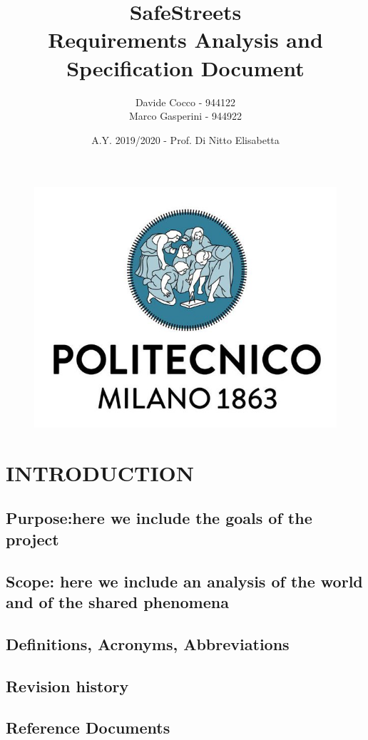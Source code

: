 \documentclass[12pt,a4paper]{article}
\author{Davide Cocco - 944122\\
	Marco Gasperini - 944922}
\date{A.Y. 2019/2020 - Prof. Di Nitto Elisabetta}
\title{
	\textbf{\Huge{SafeStreets}} \\
	\large Requirements Analysis and Specification Document
}
\begin{document}
	\begin{figure}
		\centering
		\includegraphics[width=1.0\linewidth]{Images/polimi.jpg}
	\end{figure}

	\maketitle
	\newpage
	\tableofcontents
	\newpage

\section{INTRODUCTION}
\subsection{Purpose:here we include	the goals of the project} 
\subsection{Scope:	here	we	include	an analysis	of	the	world	and	of	the	shared	phenomena} 
\subsection{Definitions,	Acronyms,	Abbreviations} 
\subsection{Revision history} 
\subsection{Reference	Documents} 
\end{document}
